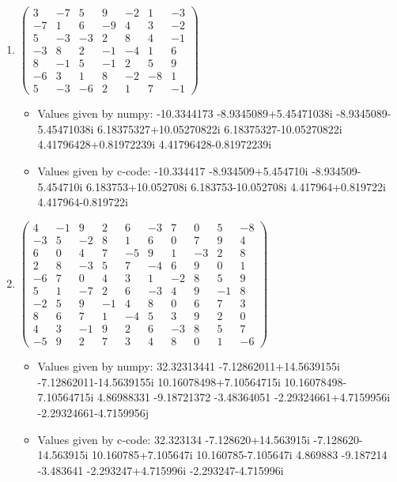 \documentclass[a4paper, 14pt]{article}
\begin{document}
\begin{enumerate}
\item $\begin{pmatrix}
  3 & -7 & 5 & 9 & -2 & 1 & -3 \\
  -7 & 1 & 6 & -9 & 4 & 3 & -2 \\
  5 & -3 & -3 & 2 & 8 & 4 & -1 \\
  -3 & 8 & 2 & -1 & -4 & 1 & 6 \\
  8 & -1 & 5 & -1 & 2 & 5 & 9 \\
  -6 & 3 & 1 & 8 & -2 & -8 & 1 \\
  5 & -3 & -6 & 2 & 1 & 7 & -1
\end{pmatrix}$
\begin{itemize}
	\item Values given by numpy: -10.3344173  -8.9345089+5.45471038i  -8.9345089-5.45471038i  6.18375327+10.05270822i  6.18375327-10.05270822i  4.41796428+0.81972239i  4.41796428-0.81972239i
	\item Values given by c-code: -10.334417  -8.934509+5.454710i  -8.934509-5.454710i  6.183753+10.052708i  6.183753-10.052708i  4.417964+0.819722i  4.417964-0.819722i
\end{itemize}

\item $\begin{pmatrix}
  4 & -1 & 9 & 2 & 6 & -3 & 7 & 0 & 5 & -8 \\
  -3 & 5 & -2 & 8 & 1 & 6 & 0 & 7 & 9 & 4 \\
  6 & 0 & 4 & 7 & -5 & 9 & 1 & -3 & 2 & 8 \\
  2 & 8 & -3 & 5 & 7 & -4 & 6 & 9 & 0 & 1 \\
  -6 & 7 & 0 & 4 & 3 & 1 & -2 & 8 & 5 & 9 \\
  5 & 1 & -7 & 2 & 6 & -3 & 4 & 9 & -1 & 8 \\
  -2 & 5 & 9 & -1 & 4 & 8 & 0 & 6 & 7 & 3 \\
  8 & 6 & 7 & 1 & -4 & 5 & 3 & 9 & 2 & 0 \\
  4 & 3 & -1 & 9 & 2 & 6 & -3 & 8 & 5 & 7 \\
  -5 & 9 & 2 & 7 & 3 & 4 & 8 & 0 & 1 & -6
\end{pmatrix}$
\begin{itemize}
	\item Values given by numpy: 32.32313441  -7.12862011+14.5639155i  -7.12862011-14.5639155i  10.16078498+7.10564715i  10.16078498-7.10564715i  4.86988331  -9.18721372  -3.48364051  -2.29324661+4.7159956i  -2.29324661-4.7159956j
	\item Values given by c-code: 32.323134  -7.128620+14.563915i  -7.128620-14.563915i  10.160785+7.105647i  10.160785-7.105647i  4.869883  -9.187214  -3.483641  -2.293247+4.715996i  -2.293247-4.715996i
\end{itemize}


\end{enumerate}
\end{document}
